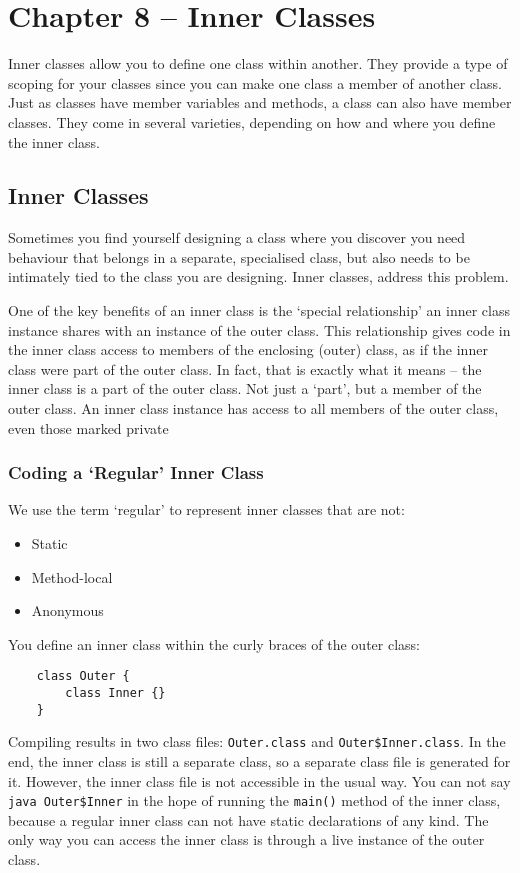 \section{Chapter 8 -- Inner Classes}
Inner classes allow you to define one class within another. They provide a type 
of scoping for your classes since you can make one class a member of another 
class. Just as classes have member variables and methods, a class can also have 
member classes. They come in several varieties, depending on how and where you 
define the inner class.

\subsection{Inner Classes}
Sometimes you find yourself designing a class where you discover you need 
behaviour that belongs in a separate, specialised class, but also needs to be 
intimately tied to the class you are designing. Inner classes, address this 
problem.

One of the key benefits of an inner class is the `special relationship' an 
inner class instance shares with an instance of the outer class. This 
relationship gives code in the inner class access to members of the enclosing 
(outer) class, as if the inner class were part of the outer class. In fact, that 
is exactly what it means -- the inner class is a part of the outer class. Not 
just a `part', but a member of the outer class. An inner class instance has 
access to all members of the outer class, even those marked private

\subsubsection{Coding a `Regular' Inner Class}
We use the term `regular' to represent inner classes that  are not:
\begin{itemize}
    \item Static
    \item Method-local
    \item Anonymous
\end{itemize}
You define an inner class within the curly braces of the outer class:
\begin{verbatim}
    class Outer {
        class Inner {}
    }
\end{verbatim}
Compiling results in two class files: \verb#Outer.class# and 
\verb#Outer$Inner.class#. In the end, the inner class is still a separate 
class, so a separate class file is generated for it. However, the inner class 
file is not accessible in the usual way. You can not say \verb#java Outer$Inner# in the hope of running the \verb#main()# method of the inner 
class, because a regular inner class can not have static declarations of any 
kind. The only way you can access the inner class is through a live instance of 
the outer class.

